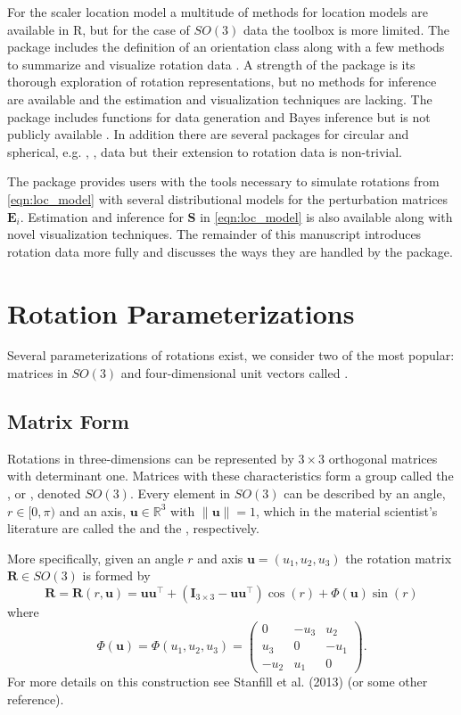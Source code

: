 For the scaler location model a multitude of methods for location models are available in R, but for the case of $SO(3)$ data the toolbox is more limited.  The  package includes the definition of an orientation class along with a few methods to summarize and visualize rotation data \citep{murdoch2003}.  A strength of the  package is its thorough exploration of rotation representations, but no methods for inference are available and the estimation and visualization techniques are lacking.  The  package includes functions for data generation and Bayes inference but is not publicly available \citet{qu2013}.  In addition there are several packages for circular and spherical, e.g. , , data but their extension to rotation data is non-trivial.

The  package provides users with the tools necessary to simulate rotations from \eqref{eqn:loc_model} with several distributional models for the perturbation matrices $\bm E_i$.  Estimation and inference for $\bm{S}$ in \eqref{eqn:loc_model} is also available along with novel visualization techniques.  The remainder of this manuscript introduces rotation data more fully and discusses the ways they are handled by the  package.


\section{Rotation Parameterizations}

Several parameterizations of rotations exist, we consider two of the most popular: matrices in $SO(3)$ and four-dimensional unit vectors called .  

\subsection{Matrix Form}

Rotations in three-dimensions can be represented by $3\times3$ orthogonal matrices with determinant one.  Matrices with these characteristics form a group called the , or , denoted $SO(3)$.  Every element in $SO(3)$ can be described by an angle, $r\in[0,\pi)$ and an axis, $\bm u\in\mathbb{R}^3$ with $\|\bm u\|=1$, which in the material scientist's literature are called the  and the , respectively.  

More specifically, given an angle $r$ and axis $\bm u=(u_1,u_2,u_3)$ the rotation matrix $\bm R\in SO(3)$ is formed by
\begin{equation}\label{eqn:angleaxis}
 \bm{R} = \bm{R}(r,\bm{u}) = \bm{u}\bm{u}^\top+(\bm{I}_{3\times3}-\bm{u}\bm{u}^\top)\cos(r) +\Phi(\bm{u})\sin(r)
\end{equation}
where
\[
\Phi(\bm{u}) = \Phi (u_1,u_2,u_3) = \left(\begin{array}{ccc}0 & -u_3 & u_2 \\ u_3 & 0 & -u_1 \\-u_2 & u_1 & 0\end{array}\right).
\]
For more details on this construction see Stanfill et al. (2013) (or some other reference).

